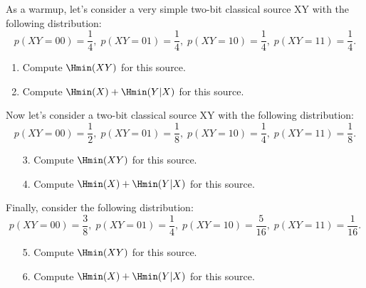 \begin{exercises}
As a warmup, let's consider a very simple two-bit classical source XY with the following distribution:
\[
p(XY = 00) = \frac14,\;
p(XY = 01) = \frac14,\;
p(XY = 10) = \frac14,\;
p(XY = 11) = \frac14.
\]
\begin{enumerate}
\item Compute $\Hmin (XY)$ for this source.
\item Compute $\Hmin (X)+\Hmin(Y| X)$ for this source.
\end{enumerate}
Now let's consider a two-bit classical source XY with the following distribution:
\[
p(XY = 00) = \frac12,\;
p(XY = 01) = \frac18,\;
p(XY = 10) = \frac14,\;
p(XY = 11) = \frac18.
\]
\begin{enumerate}
\item[3.] Compute $\Hmin (XY)$ for this source.
\item[4.] Compute $\Hmin (X)+\Hmin(Y| X)$ for this source.
%
%
\end{enumerate}
Finally, consider the following distribution:
\[
p(XY = 00) = \frac38,\;
p(XY = 01) = \frac14,\;
p(XY = 10) = \frac5{16},\;
p(XY = 11) = \frac1{16}.
\]
\begin{enumerate}
\item[5.] Compute $\Hmin (XY)$ for this source.
\item[6.] Compute $\Hmin (X)+\Hmin(Y| X)$ for this source.
\end{enumerate}
\end{exercises}
